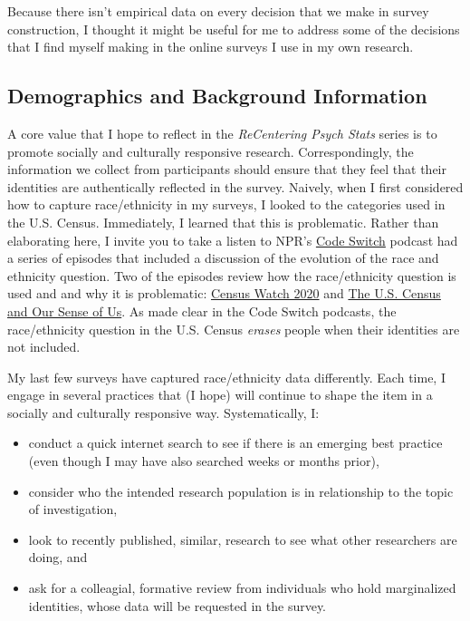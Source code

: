 \documentclass[
  english,
]{book}
\providecommand{\tightlist}{%
  \setlength{\itemsep}{0pt}\setlength{\parskip}{0pt}}
\begin{document}
Because there isn't empirical data on every decision that we make in survey construction, I thought it might be useful for me to address some of the decisions that I find myself making in the online surveys I use in my own research.

\hypertarget{demographics-and-background-information}{%
\subsection{Demographics and Background Information}\label{demographics-and-background-information}}

A core value that I hope to reflect in the \emph{ReCentering Psych Stats} series is to promote socially and culturally responsive research. Correspondingly, the information we collect from participants should ensure that they feel that their identities are authentically reflected in the survey. Naively, when I first considered how to capture race/ethnicity in my surveys, I looked to the categories used in the U.S. Census. Immediately, I learned that this is problematic. Rather than elaborating here, I invite you to take a listen to NPR's \href{https://www.npr.org/podcasts/510312/codeswitch}{Code Switch} podcast had a series of episodes that included a discussion of the evolution of the race and ethnicity question. Two of the episodes review how the race/ethnicity question is used and and why it is problematic: \href{https://www.npr.org/transcripts/607553683}{Census Watch 2020} and \href{https://www.npr.org/transcripts/540671012}{The U.S. Census and Our Sense of Us}. As made clear in the Code Switch podcasts, the race/ethnicity question in the U.S. Census \emph{erases} people when their identities are not included.

My last few surveys have captured race/ethnicity data differently. Each time, I engage in several practices that (I hope) will continue to shape the item in a socially and culturally responsive way. Systematically, I:

\begin{itemize}
\tightlist
\item
  conduct a quick internet search to see if there is an emerging best practice (even though I may have also searched weeks or months prior),
\item
  consider who the intended research population is in relationship to the topic of investigation,
\item
  look to recently published, similar, research to see what other researchers are doing, and
\item
  ask for a colleagial, formative review from individuals who hold marginalized identities, whose data will be requested in the survey.
\end{itemize}
\end{document}
